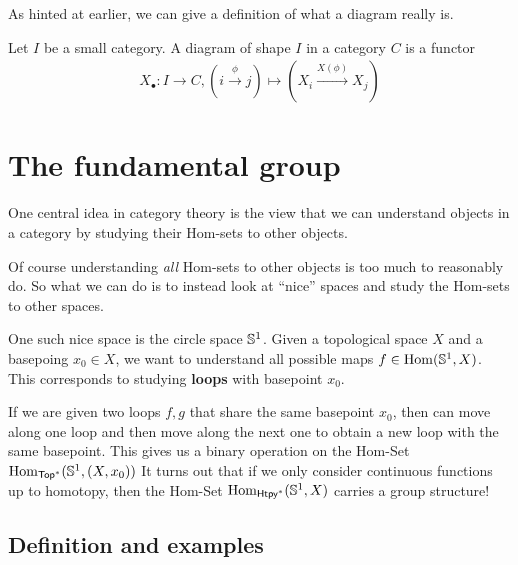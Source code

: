 As hinted at earlier, we can give a definition of what a diagram really is.

\begin{dfn}[]
  Let $I$ be a small category.
  A diagram of shape $I$ in a category $C$ is a functor 
  \begin{align*}
    X_{\bullet}: I \to  C, (i \stackrel{\phi}{\to}j) \mapsto  (X_i \stackrel{X(\phi)}{\to} X_j)
  \end{align*}
\end{dfn}

\section{The fundamental group}
One central idea in category theory is the view that we can understand objects in a category by studying their Hom-sets to other objects.

Of course understanding \emph{all} Hom-sets to other objects is too much to reasonably do.
So what we can do is to instead look at ``nice'' spaces and study the Hom-sets to other spaces.

One such nice space is the circle space $\mathbb{S}^{1}$.
Given a topological space $X$ and a basepoing $x_0 \in X$, we want to understand all possible maps $f \in \operatorname{Hom}(\mathbb{S}^{1},X)$.
This corresponds to studying \textbf{loops} with basepoint $x_0$.

If we are given two loops $f,g$ that share the same basepoint $x_0$, then can move along one loop and then move along the next one to obtain a new loop with the same basepoint.
This gives us a binary operation on the Hom-Set $\operatorname{Hom}_{\text{\sffamily Top}^{\ast}}(\mathbb{S}^{1},(X,x_0))$
It turns out that if we only consider continuous functions up to homotopy, then the Hom-Set $\operatorname{Hom}_{\text{\sffamily Htpy}^{\ast}}(\mathbb{S}^{1},X)$ carries a group structure!


\subsection{Definition and examples}


